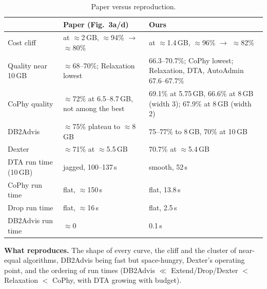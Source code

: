 \documentclass[11pt,a4paper]{article}
\begin{document}
\begin{table}[h]\centering\small
\begin{tabular}{p{4.0cm}p{4.9cm}p{5.2cm}}\toprule
 & Paper (Fig.~3a/d) & Ours\\\midrule
Cost cliff & at $\approx$2\,GB, $\approx$94\% $\to$ $\approx$80\% & at $\approx$1.4\,GB, $\approx$96\% $\to$ $\approx$82\%\\
Quality near 10\,GB & $\approx$68--70\%; Relaxation lowest & 66.3--70.7\%; CoPhy lowest; Relaxation, DTA, AutoAdmin 67.6--67.7\%\\
CoPhy quality & $\approx$72\% at 6.5--8.7\,GB, not among the best & 69.1\% at 5.75\,GB, 66.6\% at 8\,GB (width 3); 67.9\% at 8\,GB (width 2)\\
DB2Advis & $\approx$75\% plateau to $\approx$8\,GB & 75--77\% to 8\,GB, 70\% at 10\,GB\\
Dexter & $\approx$71\% at $\approx$5.5\,GB & 70.7\% at $\approx$5.4\,GB\\
DTA run time (10\,GB) & jagged, 100--137\,s & smooth, 52\,s\\
CoPhy run time & flat, $\approx$150\,s & flat, 13.8\,s\\
Drop run time & flat, $\approx$16\,s & flat, 2.5\,s\\
DB2Advis run time & $\approx$0 & 0.1\,s\\\bottomrule
\end{tabular}
\caption{Paper versus reproduction.}
\end{table}

\textbf{What reproduces.} The shape of every curve, the cliff and the cluster of near-equal algorithms, DB2Advis being fast but space-hungry, Dexter's operating point, and the ordering of run times (DB2Advis $\ll$ Extend/Drop/Dexter $<$ Relaxation $<$ CoPhy, with DTA growing with budget).
\end{document}

